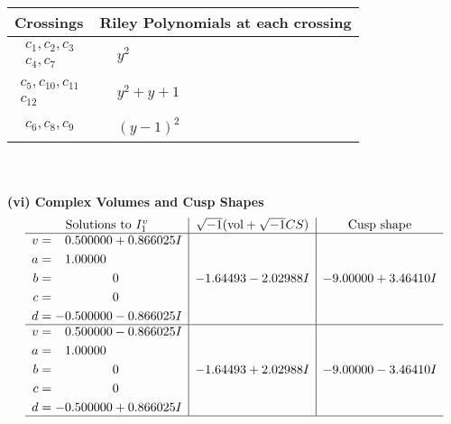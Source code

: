 \documentclass[1p]{elsarticle_modified}
\theoremstyle{definition}
\newcommand{\I}{\sqrt{-1}}
\begin{document}
\begin{tabular}{m{50pt}|m{274pt}}
Crossings & \hspace{64pt}Riley Polynomials at each crossing \\
\hline $$\begin{aligned}c_{1},c_{2},c_{3}\\c_{4},c_{7}\end{aligned}$$&$\begin{aligned}
&y^2
\end{aligned}$\\
\hline $$\begin{aligned}c_{5},c_{10},c_{11}\\c_{12}\end{aligned}$$&$\begin{aligned}
&y^2+y+1
\end{aligned}$\\
\hline $$\begin{aligned}c_{6},c_{8},c_{9}\end{aligned}$$&$\begin{aligned}
&(y-1)^2
\end{aligned}$\\
\hline
\end{tabular}\\~\\
\newpage\flushleft \textbf{(vi) Complex Volumes and Cusp Shapes}
$$\begin{array}{c|c|c}  
\text{Solutions to }I^v_{1}& \I (\text{vol} + \sqrt{-1}CS) & \text{Cusp shape}\\
 \hline 
\begin{aligned}
v &= \phantom{-}0.500000 + 0.866025 I \\
a &= \phantom{-}1.00000\phantom{ +0.000000I} \\
b &= \phantom{-0.000000 } 0 \\
c &= \phantom{-0.000000 } 0 \\
d &= -0.500000 - 0.866025 I\end{aligned}
 & -1.64493 - 2.02988 I & -9.00000 + 3.46410 I \\ \hline\begin{aligned}
v &= \phantom{-}0.500000 - 0.866025 I \\
a &= \phantom{-}1.00000\phantom{ +0.000000I} \\
b &= \phantom{-0.000000 } 0 \\
c &= \phantom{-0.000000 } 0 \\
d &= -0.500000 + 0.866025 I\end{aligned}
 & -1.64493 + 2.02988 I & -9.00000 - 3.46410 I\\
 \hline 
 \end{array}$$\newpage\newpage\renewcommand{\arraystretch}{1}
\end{document}
